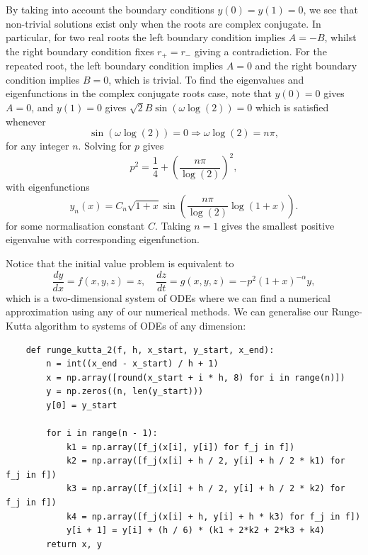 \documentclass{article}
\begin{document}
By taking into account the boundary conditions \(y(0) = y(1) = 0\), we see that non-trivial solutions exist only when the roots are complex conjugate. In particular, for two real roots the left boundary condition implies \(A = -B\), whilst the right boundary condition fixes \(r_+ = r_-\) giving a contradiction. For the repeated root, the left boundary condition implies \(A = 0\) and the right boundary condition implies \(B = 0\), which is trivial. To find the eigenvalues and eigenfunctions in the complex conjugate roots case, note that \(y(0) = 0\) gives \(A = 0\), and \(y(1) = 0\) gives \(\sqrt{2}B\sin(\omega\log(2)) = 0\) which is satisfied whenever
\[ \sin(\omega\log(2)) = 0 \Rightarrow \omega\log(2) = n\pi, \]
for any integer \(n\). Solving for \(p\) gives
\[ p^2 = \frac{1}{4} + \left(\frac{n\pi}{\log(2)}\right)^2, \]
with eigenfunctions
\[ y_n(x) = C_n\sqrt{1+x}\sin\left(\frac{n\pi}{\log(2)}\log(1+x)\right). \]
for some normalisation constant \(C\). Taking \(n = 1\) gives the smallest positive eigenvalue with corresponding eigenfunction.

Notice that the initial value problem is equivalent to
\[ \frac{dy}{dx} = f(x, y, z) = z, \quad \frac{dz}{dt} = g(x, y, z) = -p^2(1+x)^{-\alpha}y, \]
which is a two-dimensional system of ODEs where we can find a numerical approximation using any of our numerical methods. We can generalise our Runge-Kutta algorithm to systems of ODEs of any dimension:

\begin{verbatim}
    def runge_kutta_2(f, h, x_start, y_start, x_end):
        n = int((x_end - x_start) / h + 1)
        x = np.array([round(x_start + i * h, 8) for i in range(n)])
        y = np.zeros((n, len(y_start)))
        y[0] = y_start
        
        for i in range(n - 1):
            k1 = np.array([f_j(x[i], y[i]) for f_j in f])
            k2 = np.array([f_j(x[i] + h / 2, y[i] + h / 2 * k1) for f_j in f])
            k3 = np.array([f_j(x[i] + h / 2, y[i] + h / 2 * k2) for f_j in f])
            k4 = np.array([f_j(x[i] + h, y[i] + h * k3) for f_j in f])
            y[i + 1] = y[i] + (h / 6) * (k1 + 2*k2 + 2*k3 + k4)
        return x, y
\end{verbatim}
\end{document}
